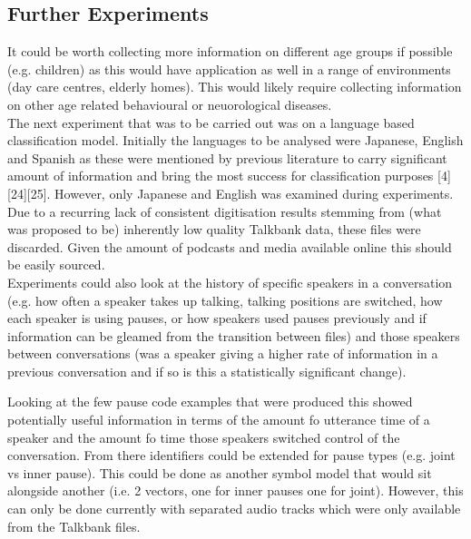 \subsection{Further Experiments}
It could be worth collecting more information on different age groups if possible (e.g. children) as this would have application as well in a range of environments (day care centres, elderly homes). This would likely require collecting information on other age related behavioural or neuorological diseases. \\

The next experiment that was to be carried out was on a language based classification model. Initially the languages to be analysed were Japanese, English and Spanish as these were mentioned by previous literature to carry significant amount of information and bring the most success for classification purposes [4][24][25]. However, only Japanese and English was examined during experiments. Due to a recurring lack of consistent digitisation results stemming from (what was proposed to be) inherently low quality Talkbank data, these files were discarded. Given the amount of podcasts and media available online this should be easily sourced.\\


Experiments could also look at the history of specific speakers in a conversation (e.g. how often a speaker takes up talking, talking positions are switched, how each speaker is using pauses, or how speakers used pauses previously and if information can be gleamed from the transition between files) and those speakers between conversations (was a speaker giving a higher rate of information in a previous conversation and if so is this a statistically significant change).

Looking at the few pause code examples that were produced this showed potentially useful information in terms of the amount fo utterance time of a speaker and the amount fo time those speakers switched control of the conversation. From there identifiers could be extended for pause types (e.g. joint vs inner pause). This could be done as another symbol model that would sit alongside another (i.e. 2 vectors, one for inner pauses one for joint). However, this can only be done currently with separated audio tracks which were only available from the Talkbank files. \\

